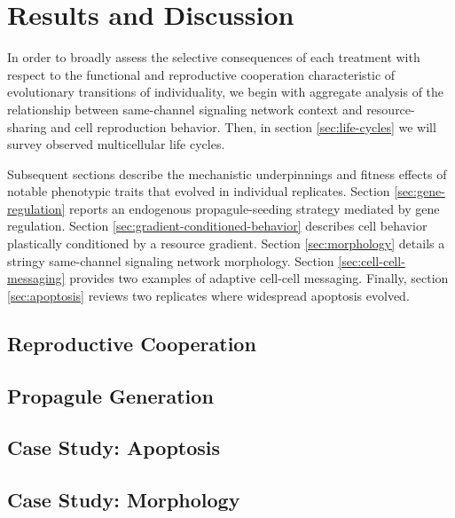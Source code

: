 \section{Results and Discussion}

In order to broadly assess the selective consequences of each treatment with respect to the functional and reproductive cooperation characteristic of evolutionary transitions of individuality, we begin with aggregate analysis of the relationship between same-channel signaling network context and resource-sharing and cell reproduction behavior.
Then, in section \ref{sec:life-cycles} we will survey observed multicellular life cycles.

Subsequent sections describe the mechanistic underpinnings and fitness effects of notable phenotypic traits that evolved in individual replicates.
Section \ref{sec:gene-regulation} reports an endogenous propagule-seeding strategy mediated by gene regulation.
Section \ref{sec:gradient-conditioned-behavior} describes cell behavior plastically conditioned by a resource gradient.
Section \ref{sec:morphology} details a stringy same-channel signaling network morphology.
Section \ref{sec:cell-cell-messaging} provides two examples of adaptive cell-cell messaging.
Finally, section \ref{sec:apoptosis} reviews two replicates where widespread apoptosis evolved.



\subsection{Reproductive Cooperation}





\subsection{Propagule Generation}



\subsection{Case Study: Apoptosis}



\subsection{Case Study: Morphology}


